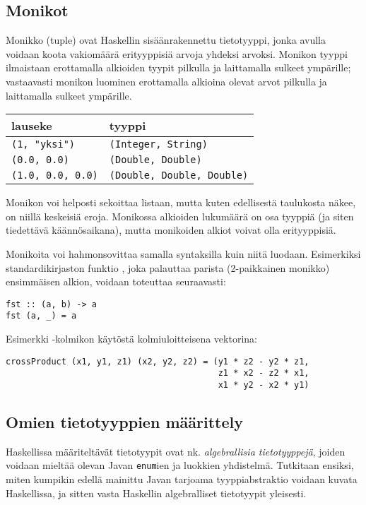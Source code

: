 \subsection{Monikot}
Monikko (tuple) ovat Haskellin sisäänrakennettu tietotyyppi,
jonka avulla voidaan koota vakiomäärä erityyppisiä arvoja yhdeksi arvoksi.
Monikon tyyppi ilmaistaan erottamalla alkioiden tyypit pilkulla ja laittamalla sulkeet ympärille;
vastaavasti monikon luominen erottamalla alkioina olevat arvot pilkulla ja laittamalla sulkeet ympärille.
\begin{center}
    \begin{tabular}[H]{l|l}
        lauseke                  &   tyyppi         \\
        \hline
        \texttt{(1, "yksi")}     &   \texttt{(Integer, String)}        \\
        \texttt{(0.0, 0.0)}      &   \texttt{(Double, Double)} \\
        \texttt{(1.0, 0.0, 0.0)} &   \texttt{(Double, Double, Double)} \\
    \end{tabular}
\end{center}

Monikon voi helposti sekoittaa listaan,
mutta kuten edellisestä taulukosta näkee,
on niillä keskeisiä eroja.
Monikossa alkioiden lukumäärä on osa tyyppiä (ja siten tiedettävä käännösaikana),
mutta monikoiden alkiot voivat olla erityyppisiä.

Monikoita voi hahmonsovittaa samalla syntaksilla kuin niitä luodaan.
Esimerkiksi standardikirjaston funktio ,
joka palauttaa parista (2-paikkainen monikko) ensimmäisen alkion,
voidaan toteuttaa seuraavasti:
\begin{verbatim}
fst :: (a, b) -> a
fst (a, _) = a
\end{verbatim}
Esimerkki -kolmikon käytöstä kolmiuloitteisena vektorina:
\begin{verbatim}
crossProduct (x1, y1, z1) (x2, y2, z2) = (y1 * z2 - y2 * z1,
                                          z1 * x2 - z2 * x1,
                                          x1 * y2 - x2 * y1)
\end{verbatim}

\subsection{Omien tietotyyppien määrittely}
Haskellissa määriteltävät tietotyypit ovat nk. \emph{algebrallisia tietotyyppejä},
joiden voidaan mieltää olevan Javan \texttt{enum}ien ja luokkien yhdistelmä.
Tutkitaan ensiksi, miten kumpikin edellä mainittu Javan tarjoama tyyppiabstraktio
voidaan kuvata Haskellissa,
ja sitten vasta Haskellin algebralliset tietotyypit yleisesti.

